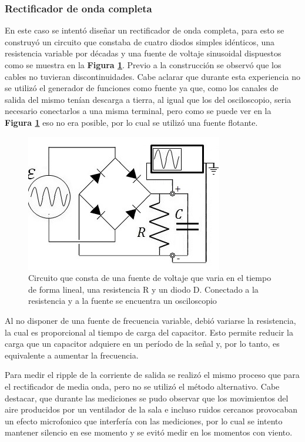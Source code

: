 \documentclass[11pt,a4paper]{article}
\begin{document}
\subsubsection{Rectificador de onda completa}
En este caso se intentó diseñar un rectificador de onda completa, para esto se construyó un circuito que constaba de cuatro diodos simples idénticos, una resistencia variable por décadas y una fuente de voltaje sinusoidal dispuestos como se muestra en la \textbf{Figura \ref{fig:Rect-O}}. Previo a la construcción se observó que los cables no tuvieran discontinuidades. Cabe aclarar que durante esta experiencia no se utilizó el generador de funciones como fuente ya que, como los canales de salida del mismo tenían descarga a tierra, al igual que los del osciloscopio, seria necesario conectarlos a una misma terminal, pero como se puede ver en la \textbf{Figura \ref{fig:Rect-O}} eso no era posible, por lo cual se utilizó una fuente flotante. 

\begin{figure}[H]
\centering
\includegraphics[scale=0.8]{Rectificador-Onda-Completa}
   \caption{Circuito que consta de una fuente de voltaje que varia en el tiempo de forma lineal, una resistencia R y un diodo D. Conectado a la resistencia y a la fuente se encuentra un osciloscopio}
   \label{fig:Rect-O}
\end{figure}

Al no disponer de una fuente de frecuencia variable, debió variarse la resistencia, la cual es proporcional al tiempo de carga del capacitor. Esto permite reducir la carga que un capacitor adquiere en un período de la señal y, por lo tanto, es equivalente a aumentar la frecuencia. 

Para medir el ripple de la corriente de salida se realizó el mismo proceso que para el rectificador de media onda, pero no se utilizó el método alternativo. Cabe destacar, que durante las mediciones se pudo observar que los movimientos del aire producidos por un ventilador de la sala e incluso ruidos cercanos provocaban un efecto microfonico que interfería con las mediciones, por lo cual se intento mantener silencio en ese momento y se evitó medir en los momentos con viento.
\end{document}
